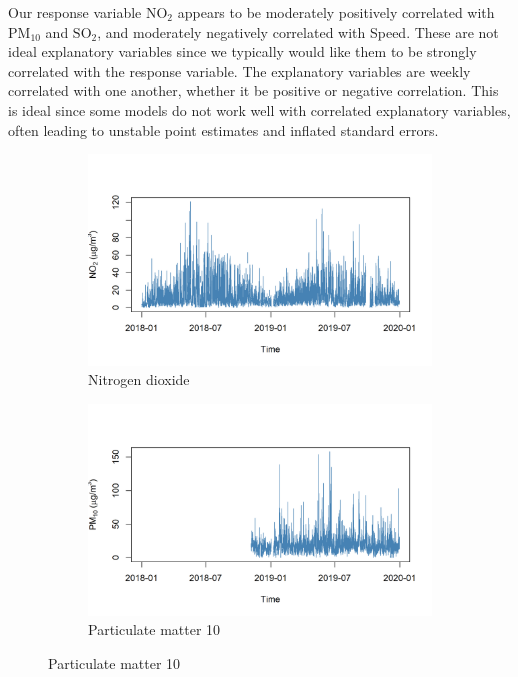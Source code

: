 \documentclass[a4paper, 10pt, fleqn]{article}
\begin{document}
\begin{flushleft}
      Our response variable $\text{NO}_{2}$ appears to be moderately positively correlated with $\text{PM}_{10}$ and $\text{SO}_{2}$, and moderately negatively correlated with Speed. These are not ideal explanatory variables since we typically would like them to be strongly correlated with the response variable. The explanatory variables are weekly correlated with one another, whether it be positive or negative correlation. This is ideal since some models do not work well with correlated explanatory variables, often leading to unstable point estimates and inflated standard errors.

      \begin{figure}[H]
         \centering
         \begin{subfigure}{0.48\linewidth}
            \centering
            \includegraphics[width=\linewidth]{../img/extracted_no2.png}
         \caption{Nitrogen dioxide}
         \end{subfigure}
         \hfill
         \begin{subfigure}{0.48\linewidth}
            \centering
            \includegraphics[width=\linewidth]{../img/extracted_pm10.png}
            \caption{Particulate matter 10}
         \end{subfigure}
         

\end{figure}
\end{flushleft}
\end{document}
